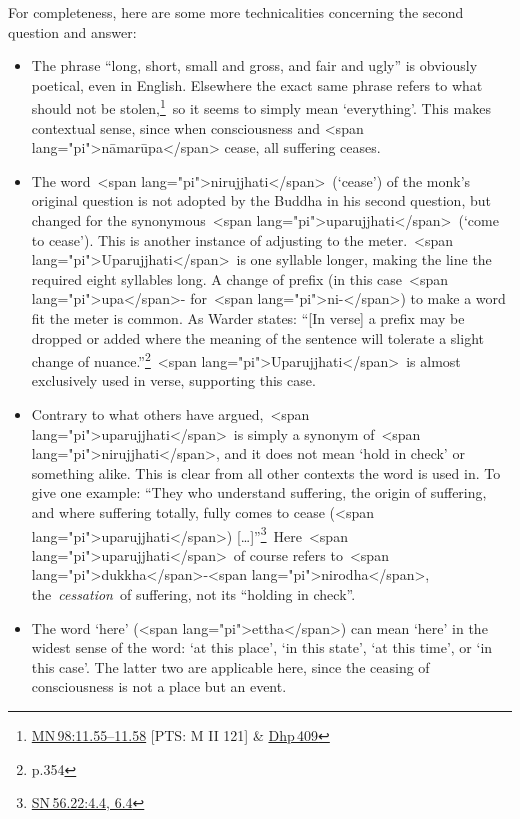 \documentclass[10pt, openright]{book}
\begin{document}
For completeness, here are some more technicalities concerning the second question and answer:


\begin{itemize}

\itemsep5pt\parskip0pt


\item
The phrase “long, short, small and gross, and fair and ugly” is obviously poetical, even in English. Elsewhere the exact same phrase refers to what should not be stolen,\footnote {\href{https://suttacentral.net/mn98/en/sujato\#11.55}{MN 98:11.55–11.58} [PTS: M II 121] \& \href{https://suttacentral.net/dhp409/en/sujato}{Dhp 409}} so it seems to simply mean ‘everything’. This makes contextual sense, since when consciousness and <span lang="pi">nāmarūpa</span> cease, all suffering ceases.



\item
The word <span lang="pi">nirujjhati</span> (‘cease’) of the monk’s original question is not adopted by the Buddha in his second question, but changed for the synonymous <span lang="pi">uparujjhati</span> (‘come to cease’). This is another instance of adjusting to the meter. <span lang="pi">Uparujjhati</span> is one syllable longer, making the line the required eight syllables long. A change of prefix (in this case <span lang="pi">upa</span>- for <span lang="pi">ni-</span>) to make a word fit the meter is common. As Warder states: “[In verse] a prefix may be dropped or added where the meaning of the sentence will tolerate a slight change of nuance.”\footnote {\cite{Warder} p.354} <span lang="pi">Uparujjhati</span> is almost exclusively used in verse, supporting this case.



\item
Contrary to what others have argued, <span lang="pi">uparujjhati</span> is simply a synonym of <span lang="pi">nirujjhati</span>, and it does not mean ‘hold in check’ or something alike. This is clear from all other contexts the word is used in. To give one example: “They who understand suffering, the origin of suffering, and where suffering totally, fully comes to cease (<span lang="pi">uparujjhati</span>) […]”\footnote {\href{https://suttacentral.net/sn56.22/en/sujato\#4.4}{SN 56.22:4.4, 6.4}} Here <span lang="pi">uparujjhati</span> of course refers to <span lang="pi">dukkha</span>-<span lang="pi">nirodha</span>, the \textit{cessation} of suffering, not its “holding in check”.



\item
The word ‘here’ (<span lang="pi">ettha</span>) can mean ‘here’ in the widest sense of the word: ‘at this place’, ‘in this state’, ‘at this time’, or ‘in this case’. The latter two are applicable here, since the ceasing of consciousness is not a place but an event.





\end{itemize}
\end{document}
